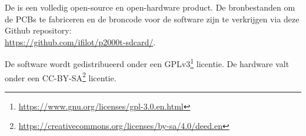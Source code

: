 
De \product is een volledig open-source en open-hardware product. De bronbestanden om de PCBs te fabriceren en de broncode voor de software zijn te verkrijgen via deze Github repository:\\ \faGithub \;\url{https://github.com/ifilot/p2000t-sdcard/}.

De software wordt gedistribueerd onder een GPLv3\footnote{\url{https://www.gnu.org/licenses/gpl-3.0.en.html}} licentie. De hardware valt onder een CC-BY-SA\footnote{\url{https://creativecommons.org/licenses/by-sa/4.0/deed.en}} licentie.